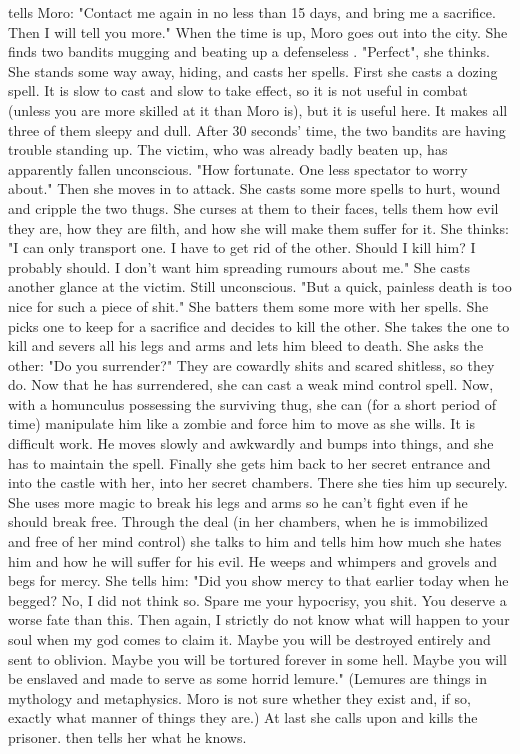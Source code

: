 \Nasshikerr tells Moro:
"Contact me again in no less than 15 days, and bring me a sacrifice. Then I will tell you more."
When the time is up, Moro goes out into the city.
She finds two \human bandits mugging and beating up a defenseless \scatha.
"Perfect", she thinks.
She stands some way away, hiding, and casts her spells.
First she casts a dozing spell. 
It is slow to cast and slow to take effect, so it is not useful in combat (unless you are more skilled at it than Moro is), but it is useful here.
It makes all three of them sleepy and dull.
After 30 seconds' time, the two bandits are having trouble standing up.
The victim, who was already badly beaten up, has apparently fallen unconscious.
"How fortunate. One less spectator to worry about."
Then she moves in to attack. 
She casts some more spells to hurt, wound and cripple the two thugs.
She curses at them to their faces, tells them how evil they are, how they are \human filth, and how she will make them suffer for it.
She thinks: 
"I can only transport one. I have to get rid of the other. Should I kill him? I probably should. I don't want him spreading rumours about me."
She casts another glance at the victim. Still unconscious.
"But a quick, painless death is too nice for such a piece of shit."
She batters them some more with her spells.
She picks one to keep for a sacrifice and decides to kill the other.
She takes the one to kill and severs all his legs and arms and lets him bleed to death.
She asks the other: "Do you surrender?"
They are cowardly shits and scared shitless, so they do.
Now that he has surrendered, she can cast a weak mind control spell.
Now, with a homunculus possessing the surviving thug, she can (for a short period of time) manipulate him like a zombie and force him to move as she wills.
It is difficult work.
He moves slowly and awkwardly and bumps into things, and she has to maintain the spell.
Finally she gets him back to her secret entrance and into the castle with her, into her secret chambers.
There she ties him up securely.
She uses more magic to break his legs and arms so he can't fight even if he should break free.
Through the deal (in her chambers, when he is immobilized and free of her mind control) she talks to him and tells him how much she hates him and how he will suffer for his evil.
He weeps and whimpers and grovels and begs for mercy.
She tells him: "Did you show mercy to that \scatha earlier today when he begged? No, I did not think so. Spare me your hypocrisy, you shit. You deserve a worse fate than this. Then again, I strictly do not know what will happen to your soul when my god \Nasshikerr comes to claim it. Maybe you will be destroyed entirely and sent to oblivion. Maybe you will be tortured forever in some hell. Maybe you will be enslaved and made to serve \Nasshikerr as some horrid lemure."
(Lemures are things in mythology and metaphysics. Moro is not sure whether they exist and, if so, exactly what manner of things they are.)
At last she calls upon \Nasshikerr and kills the prisoner.
\Nasshikerr then tells her what he knows.

